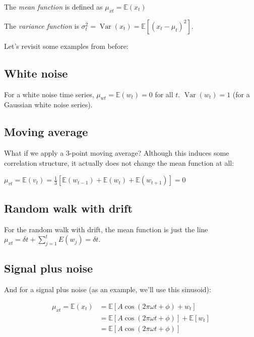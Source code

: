 \documentclass{article}
\begin{document}
The \textit{mean function} is defined as $\mu_{xt} = \mathbb{E}(x_t)$

The \textit{variance function} is $\sigma^2_t = \operatorname{Var}(x_t) = \mathbb{E}[(x_t -\mu_t)^2]$.

Let's revisit some examples from before:

\subsection{White noise}

For a white noise time series, $\mu_{wt} = \mathbb{E}(w_t)=0$ for all $t$. $\operatorname{Var}(w_t) = 1$ (for a Gaussian white noise series).

\subsection{Moving average}

What if we apply a 3-point moving average? Although this induces some correlation structure, it actually does not change the mean function at all:

$\mu_{vt} = \mathbb{E}(v_t) = \frac{1}{3}[\mathbb{E}(w_{t -1})+\mathbb{E}(w_{t})+\mathbb{E}(w_{t+1})] = 0$

\subsection{Random walk with drift}

For the random walk with drift, the mean function is just the line $\mu_{xt} = \delta t + \displaystyle\sum_{j=1}^t E(w_j) = \delta t$.

\subsection{Signal plus noise}

And for a signal plus noise (as an example, we'll use this sinusoid):

\begin{equation}
\begin{aligned}
\mu_{xt} = \mathbb{E}(x_t) &= \mathbb{E} [A \cos(2\pi \omega t + \phi) + w_t] \\ 
&= \mathbb{E} [A \cos(2\pi \omega t + \phi)] + \mathbb{E}[w_t] \\
&= \mathbb{E} [A \cos(2\pi \omega t + \phi)]
\end{aligned}
\end{equation}
\end{document}
